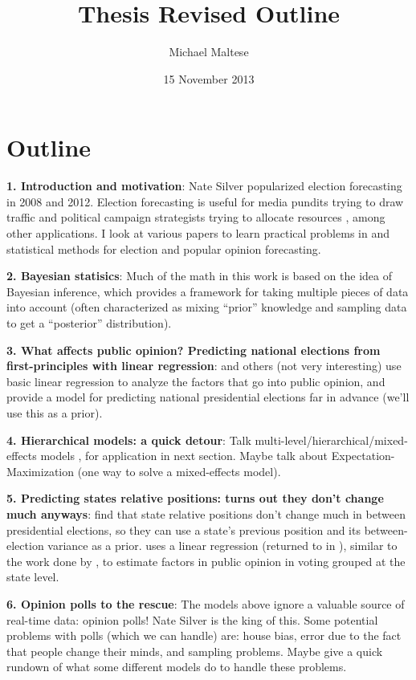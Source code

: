 \documentclass[12pt]{article}
\begin{document}
\title{\textbf{Thesis Revised Outline}}
\author{Michael Maltese}
\date{15 November 2013}
\maketitle

\section*{Outline}

\textbf{1. Introduction and motivation}: Nate Silver \citeyearpar{Silver:2012aa} popularized election forecasting in 2008 and 2012. Election forecasting is useful for media pundits trying to draw traffic and political campaign strategists trying to allocate resources \citep{Strauss:2007aa}, among other applications. I look at various papers to learn practical problems in and statistical methods for election and popular opinion forecasting.

\textbf{2. Bayesian statisics}: Much of the math in this work is based on the idea of Bayesian inference, which provides a framework for taking multiple pieces of data into account (often characterized as mixing ``prior'' knowledge and sampling data to get a ``posterior'' distribution).

\textbf{3. What affects public opinion? Predicting national elections from first-principles with linear regression}: \cite{Hibbs:2008aa} and others (not very interesting) use basic linear regression to analyze the factors that go into public opinion, and provide a model for predicting national presidential elections far in advance (we'll use this as a prior).

\textbf{4. Hierarchical models: a quick detour}: Talk multi-level/hierarchical/mixed-effects models \citep{Gelman:2006aa,Gelman:2007aa}, for application in next section. Maybe talk about Expectation-Maximization (one way to solve a mixed-effects model).

\textbf{5. Predicting states relative positions: turns out they don't change much anyways}: \cite{Lock:2010aa} find that state relative positions don't change much in between presidential elections, so they can use a state's previous position and its between-election variance as a prior. \cite{Campbell:1992aa} uses a linear regression (returned to in \citealp{Campbell:2006aa}), similar to the work done by \cite{Hibbs:2008aa}, to estimate factors in public opinion in  voting grouped at the state level.

\textbf{6. Opinion polls to the rescue}: The models above ignore a valuable source of real-time data: opinion polls! Nate Silver \citeyearpar{Silver:2012aa} is the king of this. Some potential problems with polls (which we can handle) are: house bias, error due to the fact that people change their minds, and sampling problems. Maybe give a quick rundown of what some different models do to handle these problems.
\end{document}
